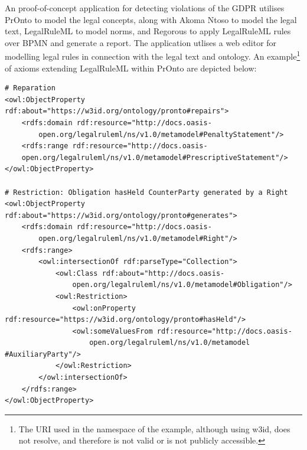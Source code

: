 An proof-of-concept application for detecting violations of the GDPR \cite{monica_modelling_2018} utilises PrOnto to model the legal concepts, along with Akoma Ntoso to model the legal text, LegalRuleML to model norms, and Regorous to apply LegalRuleML rules over BPMN and generate a report. The application utlises a web editor for modelling legal rules in connection with the legal text and ontology.
An example\footnote{The URI used in the namespace of the example, although using w3id, does not resolve, and therefore is not valid or is not publicly accessible.} of axioms extending LegalRuleML within PrOnto are depicted below:
\begin{lstlisting}
# Reparation
<owl:ObjectProperty rdf:about="https://w3id.org/ontology/pronto#repairs">
    <rdfs:domain rdf:resource="http://docs.oasis-
        open.org/legalruleml/ns/v1.0/metamodel#PenaltyStatement"/>
    <rdfs:range rdf:resource="http://docs.oasis-
    open.org/legalruleml/ns/v1.0/metamodel#PrescriptiveStatement"/>
</owl:ObjectProperty>

# Restriction: Obligation hasHeld CounterParty generated by a Right
<owl:ObjectProperty rdf:about="https://w3id.org/ontology/pronto#generates">
    <rdfs:domain rdf:resource="http://docs.oasis-
        open.org/legalruleml/ns/v1.0/metamodel#Right"/>
    <rdfs:range>
        <owl:intersectionOf rdf:parseType="Collection">
            <owl:Class rdf:about="http://docs.oasis-
                open.org/legalruleml/ns/v1.0/metamodel#Obligation"/>
            <owl:Restriction>
                <owl:onProperty rdf:resource="https://w3id.org/ontology/pronto#hasHeld"/>
                <owl:someValuesFrom rdf:resource="http://docs.oasis-
                    open.org/legalruleml/ns/v1.0/metamodel #AuxiliaryParty"/>
            </owl:Restriction>
        </owl:intersectionOf>
    </rdfs:range>
</owl:ObjectProperty>
\end{lstlisting}

